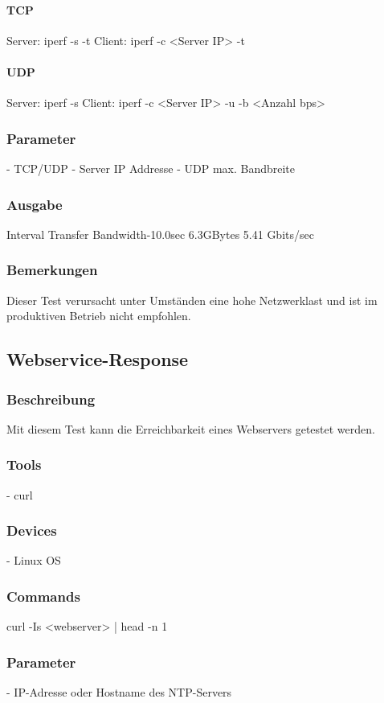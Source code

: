 \documentclass[a4,12pt]{scrartcl}
\begin{document}
\paragraph{TCP}
Server: iperf -s -t
Client: iperf -c <Server IP> -t

\paragraph{UDP}
Server: iperf -s 
Client: iperf -c <Server IP> -u -b <Anzahl bps>
\subsubsection{Parameter}
- TCP/UDP
- Server IP Addresse
- UDP max. Bandbreite
\subsubsection{Ausgabe}
Interval	Transfer	Bandwidth-10.0sec	6.3GBytes	5.41 Gbits/sec
\subsubsection{Bemerkungen}
Dieser Test verursacht unter Umständen eine hohe Netzwerklast und ist im produktiven Betrieb nicht empfohlen.

\subsection{Webservice-Response}
\subsubsection{Beschreibung}
Mit diesem Test kann die Erreichbarkeit eines Webservers getestet werden.
\subsubsection{Tools}
- curl
\subsubsection{Devices}
- Linux OS
\subsubsection{Commands}
curl -Is <webserver> | head -n 1
\subsubsection{Parameter}
- IP-Adresse oder Hostname des NTP-Servers
\end{document}
